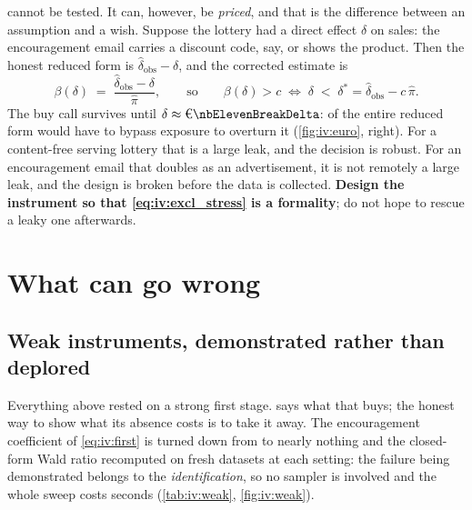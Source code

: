  cannot be tested. It can, however, be \emph{priced}, and that is the difference
between an assumption and a wish. Suppose the lottery had a direct effect $\delta$ on sales: the
encouragement email carries a discount code, say, or shows the product. Then the honest reduced form
is $\hat\delta_{\text{obs}} - \delta$, and the corrected estimate is
%
\begin{equation}
  \beta(\delta) \;=\; \frac{\hat\delta_{\text{obs}} - \delta}{\hat\pi},
  \qquad\text{so}\qquad
  \beta(\delta) > c \;\iff\; \delta \;<\; \delta^{*} = \hat\delta_{\text{obs}} - c\,\hat\pi .
  \label{eq:iv:excl_stress}
\end{equation}
%
The buy call survives until $\delta \approx \eur{\nbElevenBreakDelta}$:
\pc{\nbElevenBreakDeltaPct} of the entire \eur{\nbElevenReduced} reduced form would have to bypass
exposure to overturn it (\cref{fig:iv:euro}, right). For a content-free serving lottery that is a
large leak, and the decision is robust. For an encouragement email that doubles as an
advertisement, it is not remotely a large leak, and the design is broken before the data is
collected. \textbf{Design the instrument so that \cref{eq:iv:excl_stress} is a formality}; do not
hope to rescue a leaky one afterwards.

\section{What can go wrong}
\label{sec:iv:wrong}

\subsection*{Weak instruments, demonstrated rather than deplored}

Everything above rested on a strong first stage.  says what that buys; the
honest way to show what its absence costs is to take it away. The encouragement coefficient of
\cref{eq:iv:first} is turned down from \nbElevenWeakGammaTop{} to nearly nothing and the
closed-form Wald ratio recomputed on \nbElevenWeakNDraws{} fresh datasets at each setting: the
failure being demonstrated belongs to the \emph{identification}, so no sampler is involved and the
whole sweep costs seconds (\cref{tab:iv:weak}, \cref{fig:iv:weak}).




